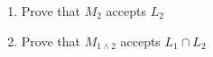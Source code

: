 \documentclass[12pt]{article}
\begin{document}
\begin{enumerate}[1.]
\begin{mdframed}
\begin{enumerate}[1.]
\begin{enumerate}[1.]
\begin{mdframed}
            \end{mdframed}
        \end{enumerate}
    \end{enumerate}
    \end{mdframed}

    \item Prove that $M_2$ accepts $L_2$
    \item Prove that $M_{1\land2}$ accepts $L_1 \cap L_2$
    \end{enumerate}
\end{document}

